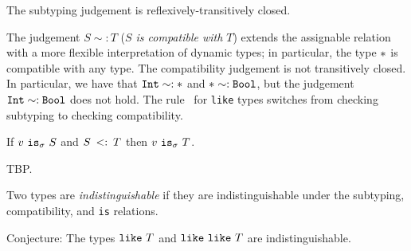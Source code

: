 \documentclass{article}
\newcommand{\Int}{\t{Int}}
\newcommand{\Bool}{\t{Bool}}
\newcommand{\dynamic}{\t{*}}
\newcommand{\subtype}[2]{#1 \,\sword\, #2}
\newcommand{\sword}{\mbox{\,\,$<:$\,\,}}
\renewcommand{\t}[1]{{\tt #1}}
\newcommand{\likety}[1]{\t{like}~#1}
\newcommand{\compatible}[2]{#1 \sim: #2 }
\newcommand{\istype}[2]{#1~\t{is}_{\sigma}~ #2}
\begin{document}
\begin{lemma}
The subtyping judgement is reflexively-transitively closed.
\end{lemma}

The judgement $\compatible{S}{T}$  (\emph{$S$ is compatible with $T$}) 
extends the assignable relation with a more flexible interpretation of dynamic types; 
in particular, the type $\dynamic$ is compatible with any type.
The compatibility judgement is not transitively closed.
In particular, we have that   $\compatible{\Int}{\dynamic}$ and
$\compatible{\dynamic}{\Bool}$, but the judgement $\compatible{\Int}{\Bool}$ does not hold. 
The rule~ for \t{like} types switches from checking subtyping to checking compatibility.

\begin{lemma}
If $\istype v S$ and $\subtype S T$ then $\istype v T$.
\end{lemma}
TBP.

Two types are \emph{indistinguishable} if they are indistinguishable under the subtyping,  compatibility, and \t{is} relations.

Conjecture: The types $\likety{T}$ and $\likety \likety T$ are indistinguishable.
\end{document}

